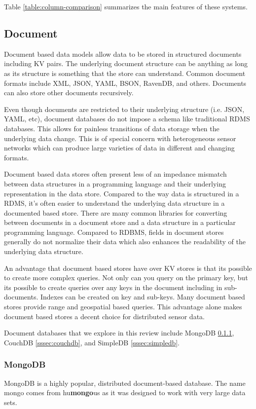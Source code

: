 \documentclass[]{article}
\begin{document}
Table \ref{table:column-comparison} summarizes the main features of these systems.

\subsection{Document}\label{ssec:document}
Document based data models allow data to be stored in structured documents including KV pairs. The underlying document structure can be anything as long as its structure is something that the store can understand. Common document formats include XML, JSON, YAML, BSON, RavenDB, and others\cite{chen_big_2014}. Documents can also store other documents recursively.

Even though documents are restricted to their underlying structure (i.e. JSON, YAML, etc), document databases do not impose a schema like traditional RDMS databases. This allows for painless transitions of data storage when the underlying data change\cite{sharma_extended_2015}.  This is of special concern with heterogeneous sensor networks which can produce large varieties of data in different and changing formats.

Document based data stores often present less of an impedance mismatch between data structures in a programming language and their underlying representation in the data store. Compared to the way data is structured in a RDMS, it's often easier to understand the underlying data structure in a documented based store. There are many common libraries for converting between documents in a document store and a data structure in a particular programming language. Compared to RDBMS, fields in document stores generally do not normalize their data which also enhances the readability of the underlying data structure\cite{ravendb}.

An advantage that document based stores have over KV stores is that its possible to create more complex queries. Not only can you query on the primary key, but its possible to create queries over any keys in the document including in sub-documents. Indexes can be created on key and sub-keys. Many document based stores provide range and geospatial based queries. This advantage alone makes document based stores a decent choice for distributed sensor data.

Document databases that we explore in this review include MongoDB \ref{sssec:mongodb}, CouchDB \ref{sssec:couchdb}, and SimpleDB \ref{sssec:simpledb}.

\subsubsection{MongoDB}\label{sssec:mongodb}
MongoDB is a highly popular, distributed document-based database\cite{mongo_arch_2016}. The name mongo comes from hu\textbf{mongo}us as it was designed to work with very large data sets. 
\end{document}
